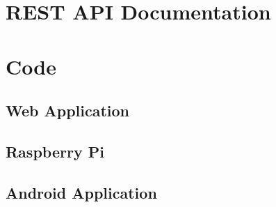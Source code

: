 \documentclass[12pt, oneside, a4paper]{book}
\begin{document}
		\newpage\chapter{REST API Documentation}
		\label{appendix:api_doc}
		
		
		\newpage\chapter{Code}
		\section{Web Application}
		
		
		
		\section{Raspberry Pi}
		
		\section{Android Application}
		
				
				
		
		
		
			

									
\end{document}

